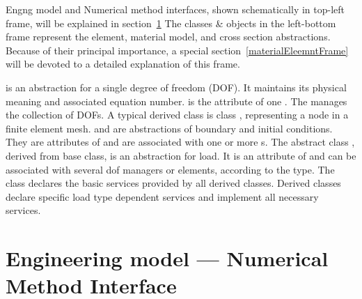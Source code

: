 \begin{htmlonly}
\begin{center}

Engng model and Numerical method interfaces, shown schematically in
top-left frame, will be explained in section~\ref{engngNummetsection}
The classes \& objects in the left-bottom frame represent the element,
material model, and cross section abstractions. Because of their
principal importance, a special 
section~\ref{materialEleemntFrame} will be devoted to a detailed
explanation of this frame. 

 is an abstraction for a single degree of freedom (DOF). It maintains
its physical meaning and associated equation number.  is
the attribute of
one . The  manages the collection
of DOFs. A typical
derived class is class , representing a node in a finite element mesh.
 and  are abstractions of boundary and
initial conditions. They are attributes of  and are associated
with one or more s. The abstract class , derived from base  class, is an abstraction for load. It is an attribute of 
and can be associated with several dof managers or elements, according to
the type. The class declares the basic services provided by
all derived classes. Derived classes declare specific load type dependent
services and implement all necessary services.



\section {Engineering model --- Numerical Method Interface}
\label{engngNummetsection}


\end{center}
\end{htmlonly}
